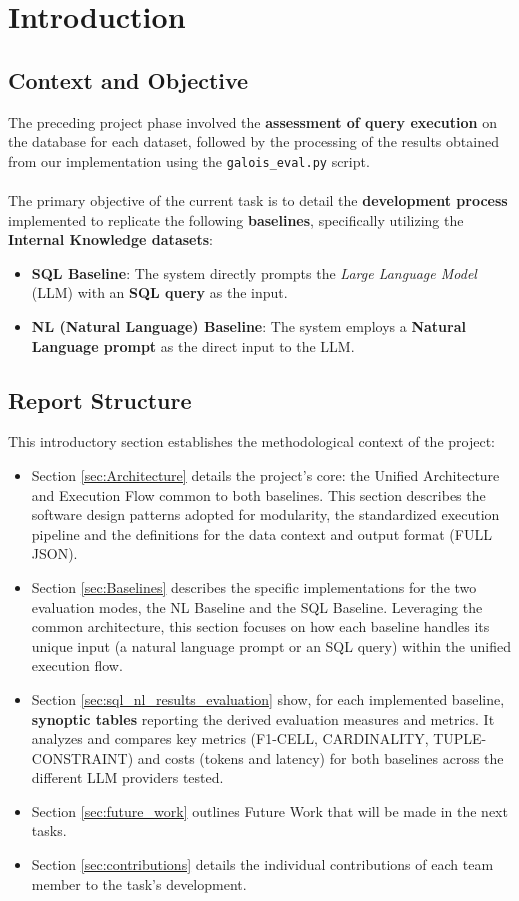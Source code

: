 \section{Introduction}
\label{sec:introduction}
\vspace{2em}
\subsection{Context and Objective}
The preceding project phase involved the \textbf{assessment of query execution} on the database for each dataset, followed by the processing of the results obtained from our implementation using the \texttt{galois\_eval.py} script.
\\\\
The primary objective of the current task is to detail the \textbf{development process} implemented to replicate the following \textbf{baselines}, specifically utilizing the \textbf{Internal Knowledge datasets}:

\begin{itemize}[leftmargin=*]
    \item \textbf{SQL Baseline}: The system directly prompts the \emph{Large Language Model} (LLM) with an \textbf{SQL query} as the input. 
    \item \textbf{NL (Natural Language) Baseline}: The system employs a \textbf{Natural Language prompt} as the direct input to the LLM.
\end{itemize}    
\vspace{8em}
\subsection{Report Structure}
This introductory section establishes the methodological context of the project:
\begin{itemize}
    \item Section \ref{sec:Architecture} details the project's core: the Unified Architecture and Execution Flow common to both baselines. This section describes the software design patterns adopted for modularity, the standardized execution pipeline and the definitions for the data context and output format (FULL JSON).
    \item Section \ref{sec:Baselines} describes the specific implementations for the two evaluation modes, the NL Baseline and the SQL Baseline. Leveraging the common architecture, this section focuses on how each baseline handles its unique input (a natural language prompt or an SQL query) within the unified execution flow.
    \item Section \ref{sec:sql_nl_results_evaluation}  show, for each implemented baseline, \textbf{synoptic tables} reporting the derived evaluation measures and metrics. It analyzes and compares key metrics (F1-CELL, CARDINALITY, TUPLE-CONSTRAINT) and costs (tokens and latency) for both baselines across the different LLM providers tested.
    \item Section \ref{sec:future_work} outlines Future Work that will be made in the next tasks.
    \item Section \ref{sec:contributions} details the individual contributions of each team member to the task's development.
\end{itemize}
